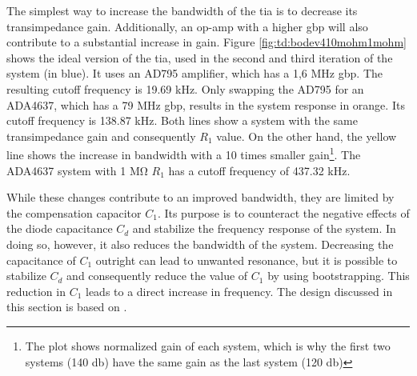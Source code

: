 The simplest way to increase the bandwidth of the \gls{tia} is to decrease its transimpedance gain. Additionally, an op-amp with a higher \gls{gbp} will also contribute to a substantial increase in gain. Figure \ref{fig:td:bodev410mohm1mohm} shows the ideal version of the \gls{tia}, used in the second and third iteration of the system (in blue). It uses an AD795 amplifier, which has a 1,6 \unit{\mega\hertz} \gls{gbp}. The resulting cutoff frequency is \num{19,69} \unit{\kilo\hertz}. Only swapping the AD795 for an ADA4637, which has a 79 \unit{\mega\hertz} \gls{gbp}, results in the system response in orange. Its cutoff frequency is \num{138,87} \unit{\kilo\hertz}. Both lines show a system with the same transimpedance gain and consequently $R_1$ value. On the other hand, the yellow line shows the increase in bandwidth with a 10 times smaller gain\footnote{The plot shows normalized gain of each system, which is why the first two systems (140 \unit{\decibel}) have the same gain as the last system (120 \unit{\decibel})}. The ADA4637 system with 1 \unit{\mega\ohm} $R_1$ has a cutoff frequency of \num{437,32} \unit{\kilo\hertz}.


While these changes contribute to an improved bandwidth, they are limited by the compensation capacitor $C_1$. Its purpose is to counteract the negative effects of the diode capacitance $C_d$ and stabilize the frequency response of the system. In doing so, however, it also reduces the bandwidth of the system. Decreasing the capacitance of $C_1$ outright can lead to unwanted resonance, but it is possible to stabilize $C_d$ and consequently reduce the value of $C_1$ by using bootstrapping. This reduction in $C_1$ leads to a direct increase in frequency. The design discussed in this section is based on \cite{sackinger2017analysis, hoyle1998bootstrapping, hoyle1999shunt, idrus2006performance}.



